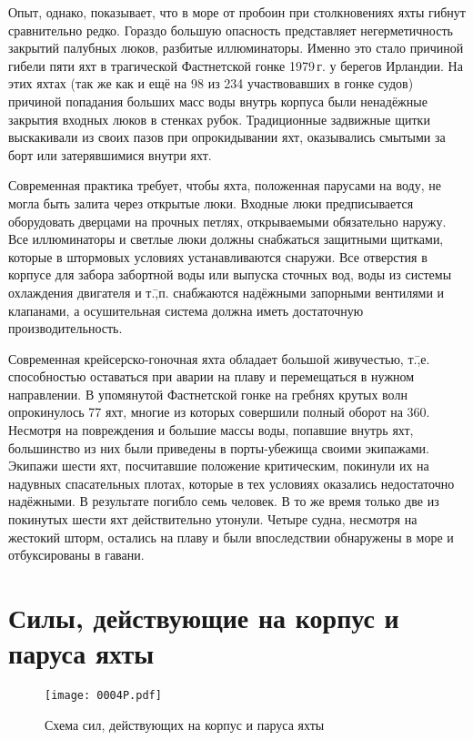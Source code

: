 Опыт, однако, показывает, что в море от пробоин при столкновениях яхты
гибнут сравнительно редко. Гораздо большую опасность представляет
негерметичность закрытий палубных люков, разбитые иллюминаторы. Именно
это стало причиной гибели пяти яхт в трагической Фастнетской гонке
1979\,г. у берегов Ирландии. На этих яхтах (так же как и ещё на 98 из
234 участвовавших в гонке судов) причиной попадания больших масс воды
внутрь корпуса были ненадёжные закрытия входных люков в стенках
рубок. Традиционные задвижные щитки выскакивали из своих пазов при
опрокидывании яхт, оказывались смытыми за борт или затерявшимися
внутри яхт.

Современная практика требует, чтобы яхта, положенная парусами на воду,
не могла быть залита через открытые люки. Входные люки предписывается
оборудовать дверцами на прочных петлях, открываемыми обязательно
наружу. Все иллюминаторы и светлые люки должны снабжаться защитными
щитками, которые в штормовых условиях устанавливаются снаружи. Все
отверстия в корпусе для забора забортной воды или выпуска сточных вод,
воды из системы охлаждения двигателя и т.\=,п. снабжаются надёжными
запорными вентилями и клапанами, а осушительная система должна иметь
достаточную производительность.

Современная крейсерско-гоночная яхта обладает большой живучестью,
т.\=,е. способностью оставаться при аварии на плаву и перемещаться в
нужном направлении. В упомянутой Фастнетской гонке на гребнях крутых
волн опрокинулось 77 яхт, многие из которых совершили полный оборот на
360\gr. Несмотря на повреждения и большие массы воды, попавшие внутрь
яхт, большинство из них были приведены в порты-убежища своими
экипажами. Экипажи шести яхт, посчитавшие положение критическим,
покинули их на надувных спасательных плотах, которые в тех условиях
оказались недостаточно надёжными. В результате погибло семь человек. В
то же время только две из покинутых шести яхт действительно
утонули. Четыре судна, несмотря на жестокий шторм, остались на плаву и
были впоследствии обнаружены в море и отбуксированы в гавани.

\section{Силы, действующие на корпус и паруса яхты}

\begin{figure}[htb]
  \centering\texttt{[image: 0004P.pdf]}
  \caption{\centering{} Схема сил, действующих на корпус и паруса яхты}
  \label{fig:4}
\end{figure}

